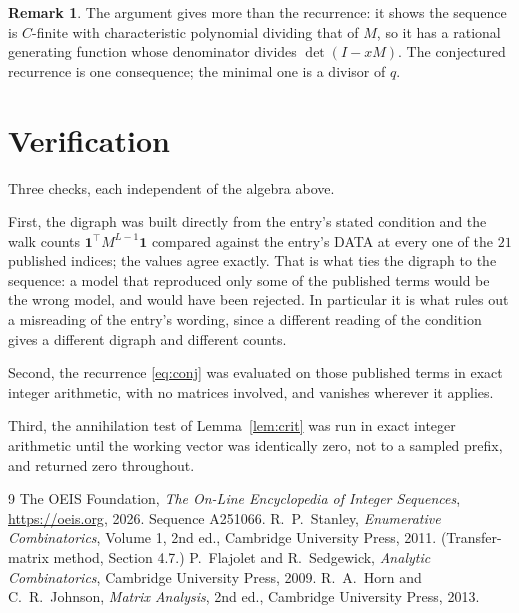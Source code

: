 \documentclass[11pt,a4paper]{article}
\theoremstyle{plain}
\theoremstyle{definition}
\newtheorem{remark}[theorem]{Remark}
\begin{document}
\begin{remark}
The argument gives more than the recurrence: it shows the sequence is $C$-finite with
characteristic polynomial dividing that of $M$, so it has a rational generating function
whose denominator divides $\det(I-xM)$. The conjectured recurrence is one consequence; the
minimal one is a divisor of $q$.
\end{remark}

\section{Verification}

Three checks, each independent of the algebra above.

First, the digraph was built directly from the entry's stated condition and the walk counts
$\mathbf{1}^{\!\top}M^{L-1}\mathbf{1}$ compared against the entry's DATA at
every one of the $21$ published indices; the values agree exactly. That is what ties
the digraph to the sequence: a model that reproduced only some of the published terms would
be the wrong model, and would have been rejected. In particular it is what rules out a
misreading of the entry's wording, since a different reading of the condition gives a
different digraph and different counts.

Second, the recurrence \eqref{eq:conj} was evaluated on those published terms in exact
integer arithmetic, with no matrices involved, and vanishes wherever it applies.

Third, the annihilation test of Lemma~\ref{lem:crit} was run in exact integer arithmetic
until the working vector was identically zero, not to a sampled prefix, and returned zero
throughout.

\begin{thebibliography}{9}
 The OEIS Foundation, \emph{The On-Line Encyclopedia of Integer
Sequences}, \url{https://oeis.org}, 2026. Sequence A251066.
 R.~P.~Stanley, \emph{Enumerative Combinatorics}, Volume 1, 2nd ed.,
Cambridge University Press, 2011. (Transfer-matrix method, Section 4.7.)
 P.~Flajolet and R.~Sedgewick, \emph{Analytic Combinatorics}, Cambridge
University Press, 2009.
 R.~A.~Horn and C.~R.~Johnson, \emph{Matrix Analysis}, 2nd ed., Cambridge
University Press, 2013.
\end{thebibliography}
\end{document}

